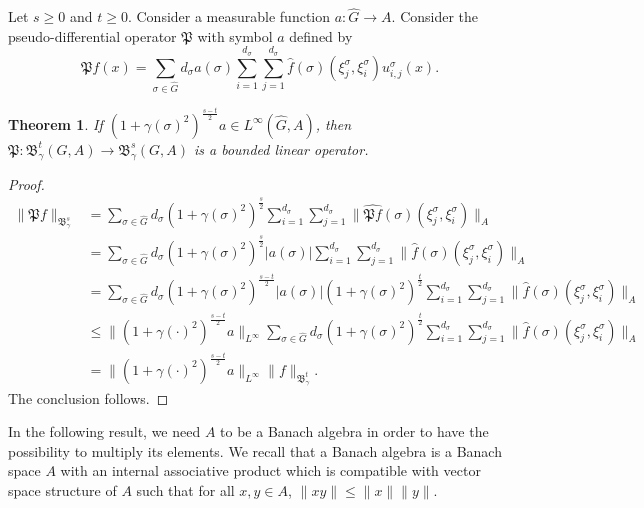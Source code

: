 \documentclass[12pt]{amsart}%
\newtheorem{theorem}{Theorem}[section]
\begin{document}
Let $s\geq 0$ and $t\geq 0$. Consider a measurable function $a: \widehat{G}\rightarrow A$.  Consider the pseudo-differential operator $\mathfrak{P}$ with symbol $a$ defined by
\begin{equation}
\mathfrak{P}f(x)=\sum_{\sigma\in \widehat{G}}d_\sigma  a(\sigma)\sum_{i=1}^{d_\sigma}\sum_{j=1}^{d_\sigma}\widehat{f}(\sigma)(\xi_j^\sigma, \xi_i^\sigma)u_{i,j}^\sigma (x).
\end{equation}
\begin{theorem}
If $(1+\gamma (\sigma)^2)^{\frac{s-t}{2}}a \in L^{\infty}(\widehat{G}, A)$, then $\mathfrak{P} : \mathfrak{B}^{t}_\gamma (G, A) \rightarrow \mathfrak{B}^{s}_\gamma (G, A)$ is a bounded linear operator.
\end{theorem}
\begin{proof}
\begin{align*}
\|\mathfrak{P}f\|_{\mathfrak{B}^{s}_\gamma}&=\sum_{\sigma\in \widehat{G}}d_\sigma  (1+\gamma (\sigma)^2)^{\frac{s}{2}}\sum_{i=1}^{d_\sigma}\sum_{j=1}^{d_\sigma}\|\widehat{\mathfrak{P}f}(\sigma)(\xi_j^\sigma, \xi_i^\sigma)\|_A\\
&=\sum_{\sigma\in \widehat{G}}d_\sigma  (1+\gamma (\sigma)^2)^{\frac{s}{2}}|a(\sigma)|\sum_{i=1}^{d_\sigma}\sum_{j=1}^{d_\sigma}\|\widehat{f}(\sigma)(\xi_j^\sigma, \xi_i^\sigma)\|_A\\
&=\sum_{\sigma\in \widehat{G}}d_\sigma  (1+\gamma (\sigma)^2)^{\frac{s-t}{2}}|a(\sigma)|(1+\gamma (\sigma)^2)^{\frac{t}{2}}\sum_{i=1}^{d_\sigma}\sum_{j=1}^{d_\sigma}\|\widehat{f}(\sigma)(\xi_j^\sigma, \xi_i^\sigma)\|_A\\
&\leq \|(1+\gamma (\cdot)^2)^{\frac{s-t}{2}}a\|_{L^\infty}\sum_{\sigma\in \widehat{G}}d_\sigma  (1+\gamma (\sigma)^2)^{\frac{t}{2}}\sum_{i=1}^{d_\sigma}\sum_{j=1}^{d_\sigma}\|\widehat{f}(\sigma)(\xi_j^\sigma, \xi_i^\sigma)\|_A\\
&=\|(1+\gamma (\cdot)^2)^{\frac{s-t}{2}}a\|_{L^\infty}\|f\|_{\mathfrak{B}^{t}_\gamma}.
\end{align*}
The conclusion follows.
\end{proof}


In the following result, we need $A$ to be a Banach algebra in order to have the possibility to multiply  its elements. We recall that a Banach algebra is a Banach space $A$ with an internal associative product which is compatible with vector space structure of $A$ such that for all $x,y\in A$, 
$\|xy\|\leq \|x\|\|y\|$.
\end{document}
